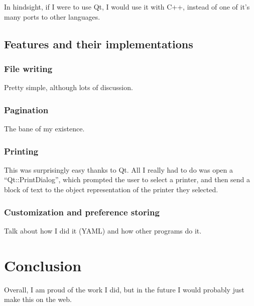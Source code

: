 \documentclass[11pt]{article}
\begin{document}
In hindsight, if I were to use Qt, I would use it with C++, instead of one of it's many ports to other languages.

\subsection{Features and their implementations}

\subsubsection{File writing}

Pretty simple, although lots of discussion.

\subsubsection{Pagination}

The bane of my existence.

\subsubsection{Printing}

This was surprisingly easy thanks to Qt. All I really had to do was open a ``Qt::PrintDialog'', which prompted the user to select a printer, and then send a block of text to the object representation of the printer they selected.

\subsubsection{Customization and preference storing}

Talk about how I did it (YAML) and how other programs do it.

\section{Conclusion}

Overall, I am proud of the work I did, but in the future I would probably just make this on the web.

\newpage
\nocite{*}


\end{document}
